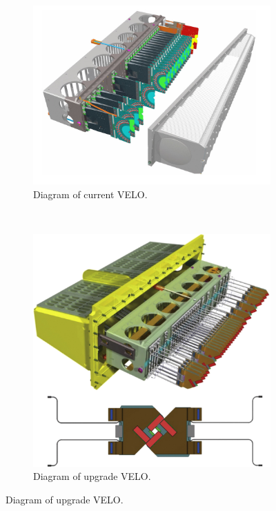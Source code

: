 \begin{figure}[!h] %
\centering
\begin{subfigure}[t]{0.45\textwidth}
\centering
\includegraphics[width=\textwidth]{CurrentVelo}
\caption{Diagram of current VELO.} 
\label{fig:CurrentVelo} 
\end{subfigure}
~
\begin{subfigure}[t]{0.45\textwidth}
\includegraphics[width=\textwidth]{UpgradeVELO}
\caption{Diagram of upgrade VELO.} 
\label{fig:UpgradeVELO}
\end{subfigure}
\end{figure}

